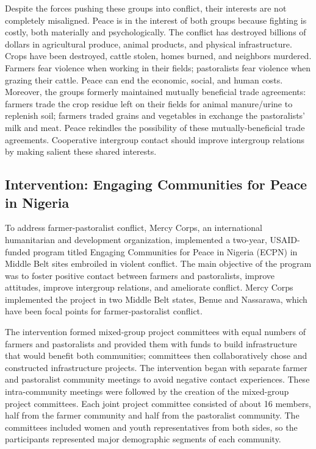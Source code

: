 \documentclass[11pt]{article}
\begin{document}
Despite the forces pushing these groups into conflict, their interests
are not completely misaligned. Peace is in the interest of both groups
because fighting is costly, both materially and psychologically. The
conflict has destroyed billions of dollars in agricultural produce,
animal products, and physical infrastructure. Crops have been destroyed,
cattle stolen, homes burned, and neighbors murdered. Farmers fear
violence when working in their fields; pastoralists fear violence when
grazing their cattle. Peace can end the economic, social, and human
costs. Moreover, the groups formerly maintained mutually beneficial
trade agreements: farmers trade the crop residue left on their fields
for animal manure/urine to replenish soil; farmers traded grains and
vegetables in exchange the pastoralists' milk and meat. Peace rekindles
the possibility of these mutually-beneficial trade agreements.
Cooperative intergroup contact should improve intergroup relations by
making salient these shared interests.

\hypertarget{intervention-engaging-communities-for-peace-in-nigeria}{%
\subsection{Intervention: Engaging Communities for Peace in
Nigeria}\label{intervention-engaging-communities-for-peace-in-nigeria}}

To address farmer-pastoralist conflict, Mercy Corps, an international
humanitarian and development organization, implemented a two-year,
USAID-funded program titled Engaging Communities for Peace in Nigeria
(ECPN) in Middle Belt sites embroiled in violent conflict. The main
objective of the program was to foster positive contact between farmers
and pastoralists, improve attitudes, improve intergroup relations, and
ameliorate conflict. Mercy Corps implemented the project in two Middle
Belt states, Benue and Nassarawa, which have been focal points for
farmer-pastoralist conflict.

The intervention formed mixed-group project committees with equal
numbers of farmers and pastoralists and provided them with funds to
build infrastructure that would benefit both communities; committees
then collaboratively chose and constructed infrastructure projects. The
intervention began with separate farmer and pastoralist community
meetings to avoid negative contact experiences. These intra-community
meetings were followed by the creation of the mixed-group project
committees. Each joint project committee consisted of about 16 members,
half from the farmer community and half from the pastoralist community.
The committees included women and youth representatives from both sides,
so the participants represented major demographic segments of each
community.
\end{document}
